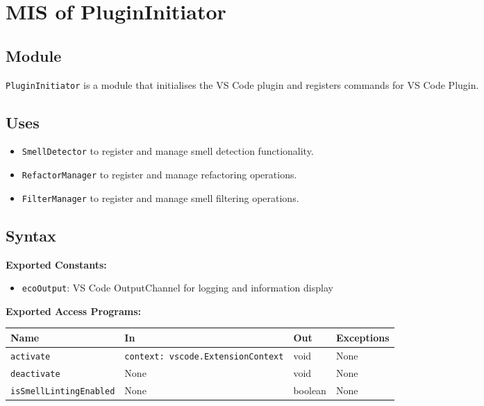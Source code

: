 \documentclass[12pt, titlepage]{article}
\begin{document}
\newpage

\section{MIS of PluginInitiator}

\subsection{Module}
\texttt{PluginInitiator} is a module that initialises the VS Code plugin and registers commands for VS Code Plugin.

\subsection{Uses}
\begin{itemize}
    \item \texttt{SmellDetector} to register and manage smell detection functionality.
    \item \texttt{RefactorManager} to register and manage refactoring operations.
    \item \texttt{FilterManager} to register and manage smell filtering operations.
\end{itemize}

\subsection{Syntax}

\textbf{Exported Constants:} 
\begin{itemize}
    \item \texttt{ecoOutput}: VS Code OutputChannel for logging and information display
\end{itemize}

\noindent \textbf{Exported Access Programs:}\\
\begin{tabularx}{\linewidth}{|l|>{\raggedright\arraybackslash}X|l|l|}
    \hline
    \textbf{Name} & \textbf{In} & \textbf{Out} & \textbf{Exceptions} \\
    \hline
    \texttt{activate} & \texttt{context: vscode.ExtensionContext} & void & None \\
    \hline
    \texttt{deactivate} & None & void & None \\
    \hline
    \texttt{isSmellLintingEnabled} & None & boolean & None \\
    \hline
\end{tabularx}
\end{document}
